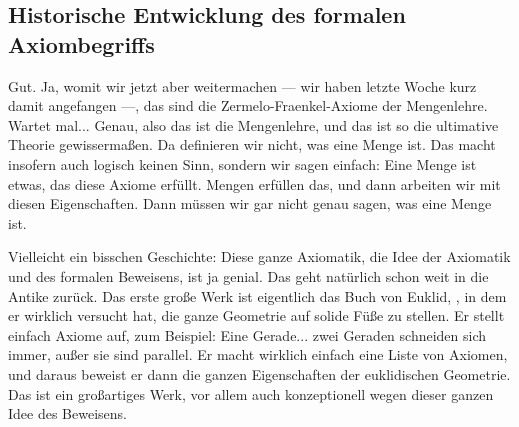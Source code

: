 \subsection{Historische Entwicklung des formalen Axiombegriffs}
\begin{spoken-clean}[00:06:36 - 00:08:20]
Gut. Ja, womit wir jetzt aber weitermachen --- wir haben letzte Woche kurz damit angefangen ---, das sind die Zermelo-Fraenkel-Axiome der Mengenlehre. Wartet mal... Genau, also das ist die Mengenlehre, und das ist so die ultimative Theorie gewissermaßen. Da definieren wir nicht, was eine Menge ist. Das macht insofern auch logisch keinen Sinn, sondern wir sagen einfach: Eine Menge ist etwas, das diese Axiome erfüllt. Mengen erfüllen das, und dann arbeiten wir mit diesen Eigenschaften. Dann müssen wir gar nicht genau sagen, was eine Menge ist.

Vielleicht ein bisschen Geschichte: Diese ganze Axiomatik, die Idee der Axiomatik und des formalen Beweisens, ist ja genial. Das geht natürlich schon weit in die Antike zurück. Das erste große Werk ist eigentlich das Buch von Euklid, , in dem er wirklich versucht hat, die ganze Geometrie auf solide Füße zu stellen. Er stellt einfach Axiome auf, zum Beispiel: Eine Gerade... zwei Geraden schneiden sich immer, außer sie sind parallel. Er macht wirklich einfach eine Liste von Axiomen, und daraus beweist er dann die ganzen Eigenschaften der euklidischen Geometrie. Das ist ein großartiges Werk, vor allem auch konzeptionell wegen dieser ganzen Idee des Beweisens.
\end{spoken-clean}

